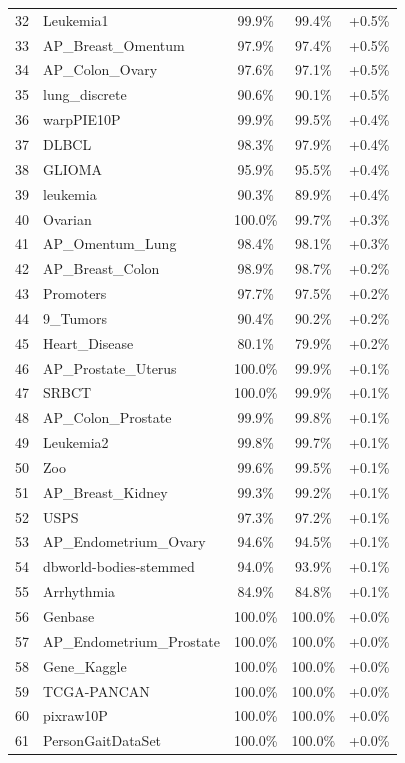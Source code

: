 \documentclass[preprint,12pt,authoryear]{elsarticle}
\begin{document}
{\begin{longtable}{|c|p{4.5cm}|c|c|c|}
32 & Leukemia1 & 99.9\% & 99.4\% & +0.5\% \\
33 & AP\_Breast\_Omentum & 97.9\% & 97.4\% & +0.5\% \\
34 & AP\_Colon\_Ovary & 97.6\% & 97.1\% & +0.5\% \\
35 & lung\_discrete & 90.6\% & 90.1\% & +0.5\% \\
36 & warpPIE10P & 99.9\% & 99.5\% & +0.4\% \\
37 & DLBCL & 98.3\% & 97.9\% & +0.4\% \\
38 & GLIOMA & 95.9\% & 95.5\% & +0.4\% \\
39 & leukemia & 90.3\% & 89.9\% & +0.4\% \\
40 & Ovarian & 100.0\% & 99.7\% & +0.3\% \\
41 & AP\_Omentum\_Lung & 98.4\% & 98.1\% & +0.3\% \\
42 & AP\_Breast\_Colon & 98.9\% & 98.7\% & +0.2\% \\
43 & Promoters & 97.7\% & 97.5\% & +0.2\% \\
44 & 9\_Tumors & 90.4\% & 90.2\% & +0.2\% \\
45 & Heart\_Disease & 80.1\% & 79.9\% & +0.2\% \\
46 & AP\_Prostate\_Uterus & 100.0\% & 99.9\% & +0.1\% \\
47 & SRBCT & 100.0\% & 99.9\% & +0.1\% \\
48 & AP\_Colon\_Prostate & 99.9\% & 99.8\% & +0.1\% \\
49 & Leukemia2 & 99.8\% & 99.7\% & +0.1\% \\
50 & Zoo & 99.6\% & 99.5\% & +0.1\% \\
51 & AP\_Breast\_Kidney & 99.3\% & 99.2\% & +0.1\% \\
52 & USPS & 97.3\% & 97.2\% & +0.1\% \\
53 & AP\_Endometrium\_Ovary & 94.6\% & 94.5\% & +0.1\% \\
54 & dbworld-bodies-stemmed & 94.0\% & 93.9\% & +0.1\% \\
55 & Arrhythmia & 84.9\% & 84.8\% & +0.1\% \\
56 & Genbase & 100.0\% & 100.0\% & +0.0\% \\
57 & AP\_Endometrium\_Prostate & 100.0\% & 100.0\% & +0.0\% \\
58 & Gene\_Kaggle & 100.0\% & 100.0\% & +0.0\% \\
59 & TCGA-PANCAN & 100.0\% & 100.0\% & +0.0\% \\
60 & pixraw10P & 100.0\% & 100.0\% & +0.0\% \\
61 & PersonGaitDataSet & 100.0\% & 100.0\% & +0.0\% \\

\end{longtable}}
\end{document}
